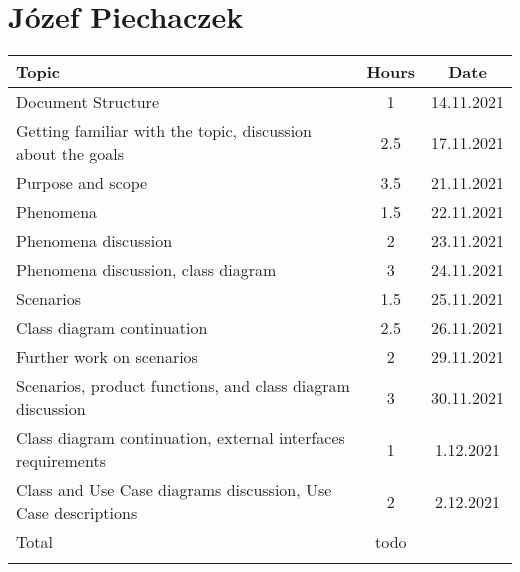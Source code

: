 \section*{Józef Piechaczek}
\begin{table}[H]
    \centering
    \begin{tabular}{lcc} \Xhline{1.5pt}
        Topic &  Hours & Date \\ \hline
        Document Structure & 1 & 14.11.2021 \\ 
        Getting familiar with the topic, discussion about the goals & 2.5 & 17.11.2021 \\ 
        Purpose and scope & 3.5 & 21.11.2021 \\ 
        Phenomena & 1.5 & 22.11.2021 \\ 
        Phenomena discussion & 2 & 23.11.2021 \\
        Phenomena discussion, class diagram & 3 & 24.11.2021 \\ 
        Scenarios & 1.5 & 25.11.2021 \\
        Class diagram continuation & 2.5 & 26.11.2021 \\ 
        Further work on scenarios & 2 & 29.11.2021 \\
        Scenarios, product functions, and class diagram discussion & 3 & 30.11.2021\\ 
        Class diagram continuation, external interfaces requirements & 1 & 1.12.2021\\
        Class and Use Case diagrams discussion, Use Case descriptions & 2 & 2.12.2021\\ \hline
        Total &  todo & \\ \Xhline{1.5pt}
    \end{tabular}
\end{table}

